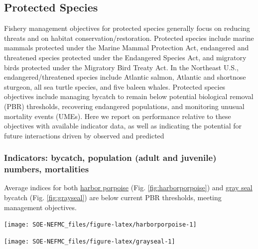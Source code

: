 \documentclass[
  10pt,
]{article}
\let\origfigure\figure
\let\endorigfigure\endfigure
\renewenvironment{figure}[1][2] {
    \expandafter\origfigure\expandafter[H]
} {
    \endorigfigure
}
\begin{document}
\hypertarget{protected-species}{%
\subsection{Protected Species}\label{protected-species}}

Fishery management objectives for protected species generally focus on reducing threats and on habitat conservation/restoration. Protected species include marine mammals protected under the Marine Mammal Protection Act, endangered and threatened species protected under the Endangered Species Act, and migratory birds protected under the Migratory Bird Treaty Act. In the Northeast U.S., endangered/threatened species include Atlantic salmon, Atlantic and shortnose sturgeon, all sea turtle species, and five baleen whales. Protected species objectives include managing bycatch to remain below potential biological removal (PBR) thresholds, recovering endangered populations, and monitoring unusual mortality events (UMEs). Here we report on performance relative to these objectives with available indicator data, as well as indicating the potential for future interactions driven by observed and predicted

\hypertarget{indicators-bycatch-population-adult-and-juvenile-numbers-mortalities}{%
\subsubsection{Indicators: bycatch, population (adult and juvenile) numbers, mortalities}\label{indicators-bycatch-population-adult-and-juvenile-numbers-mortalities}}

Average indices for both \href{https://noaa-edab.github.io/catalog/harbor-porpoise-bycatch.html}{harbor porpoise} (Fig. \ref{fig:harborporpoise}) and \href{https://noaa-edab.github.io/catalog/gray-seal-bycatch.html}{gray seal} bycatch (Fig. \ref{fig:grayseal}) are below current PBR thresholds, meeting management objectives.

\begin{figure}

{\centering \texttt{[image: SOE-NEFMC\_files/figure-latex/harborporpoise-1]} 

}

\caption{Harbor porpoise average bycatch estimate for Mid-Atlantic and New England gillnet fisheries (blue) and the potential biological removal (red).}\label{fig:harborporpoise}
\end{figure}
\begin{figure}

{\centering \texttt{[image: SOE-NEFMC\_files/figure-latex/grayseal-1]} 

}

\caption{Gray Seal average bycatch estimate for gillnet fisheries (blue) and the potential biological removal (red).}\label{fig:grayseal}
\end{figure}
\end{document}
